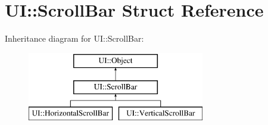 \hypertarget{struct_u_i_1_1_scroll_bar}{}\section{UI\+:\+:Scroll\+Bar Struct Reference}
\label{struct_u_i_1_1_scroll_bar}
Inheritance diagram for UI\+:\+:Scroll\+Bar\+:\begin{figure}[H]
\begin{center}
\leavevmode
\includegraphics[height=3.000000cm]{struct_u_i_1_1_scroll_bar}
\end{center}
\end{figure}
